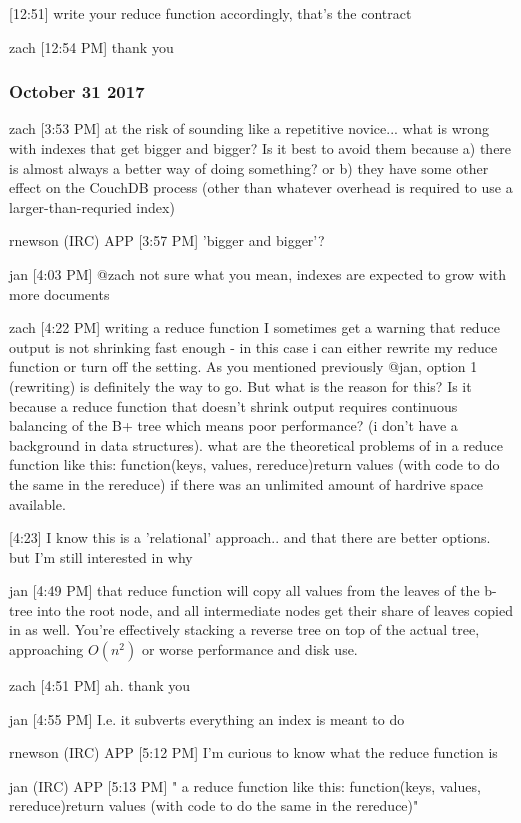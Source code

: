     [12:51]
write your reduce function accordingly, that's the contract

zach [12:54 PM]
thank you

\subsubsection{October 31 2017}
\label{slack-31-oct}
zach [3:53 PM]
at the risk of sounding like a repetitive novice... what is wrong with indexes that get bigger and bigger? Is it best to avoid them because a) there is almost always a better way of doing something? or b) they have some other effect on the CouchDB process (other than whatever overhead is required to use a larger-than-requried index)

rnewson (IRC) APP [3:57 PM]
'bigger and bigger'?

jan [4:03 PM]
@zach not sure what you mean, indexes are expected to grow with more documents

zach [4:22 PM]
writing a reduce function I sometimes get a warning that reduce output is not shrinking fast enough - in this case i can either rewrite my reduce function or turn off the setting. As you mentioned previously @jan, option 1 (rewriting) is definitely the way to go. But what is the reason for this? Is it because a reduce function that doesn't shrink output requires continuous balancing of the B+ tree which means poor performance? (i don't have a background in data structures). what are the theoretical problems of in a reduce function like this: function(keys, values, rereduce){return values (with code to do the same in the rereduce)} if there was an unlimited amount of hardrive space available.

[4:23]
I know this is a 'relational' approach.. and that there are better options. but I'm still interested in why

jan [4:49 PM]
that reduce function will copy all values from the leaves of the b-tree into the root node, and all intermediate nodes get their share of leaves copied in as well. You’re effectively stacking a reverse tree on top of the actual tree, approaching $ O(n^2) $ or worse performance and disk use.

zach [4:51 PM]
ah. thank you

jan [4:55 PM]
I.e. it subverts everything an index is meant to do

rnewson (IRC) APP [5:12 PM]
I'm curious to know what the reduce function is

jan (IRC) APP [5:13 PM]
" a reduce function like this: function(keys, values, rereduce){return values (with code to do the same in the rereduce)}"

